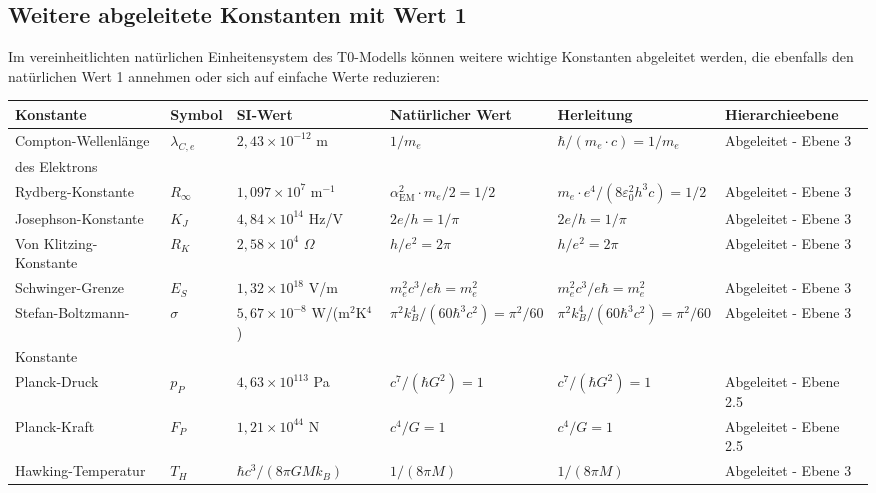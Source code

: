 \documentclass[12pt,a4paper]{article}
\newcommand{\alphaEM}{\alpha_{\text{EM}}}
\begin{document}
	\subsection{Weitere abgeleitete Konstanten mit Wert 1}
	
	Im vereinheitlichten natürlichen Einheitensystem des T0-Modells können weitere wichtige Konstanten abgeleitet werden, die ebenfalls den natürlichen Wert 1 annehmen oder sich auf einfache Werte reduzieren:
	
	\begin{table}[ht]
		\centering
		\begin{adjustbox}{scale=0.65}
			\begin{tabular}{llllll}
				\hline
				\textbf{Konstante} & \textbf{Symbol} & \textbf{SI-Wert} & \textbf{Natürlicher Wert} & \textbf{Herleitung} & \textbf{Hierarchieebene} \\
				\hline
				Compton-Wellenlänge & $\lambda_{C,e}$ & $2,43 \times 10^{-12}$ m & $1/m_e$ & $\hbar/(m_e\cdot c) = 1/m_e$ & Abgeleitet - Ebene 3 \\
				des Elektrons & & & & & \\
				Rydberg-Konstante & $R_\infty$ & $1,097 \times 10^7$ m$^{-1}$ & $\alphaEM^2\cdot m_e/2 = 1/2$ & $m_e\cdot e^4/(8\varepsilon_0^2h^3c) = 1/2$ & Abgeleitet - Ebene 3 \\
				Josephson-Konstante & $K_J$ & $4,84 \times 10^{14}$ Hz/V & $2e/h = 1/\pi$ & $2e/h = 1/\pi$ & Abgeleitet - Ebene 3 \\
				Von Klitzing-Konstante & $R_K$ & $2,58 \times 10^4$ $\Omega$ & $h/e^2 = 2\pi$ & $h/e^2 = 2\pi$ & Abgeleitet - Ebene 3 \\
				Schwinger-Grenze & $E_S$ & $1,32 \times 10^{18}$ V/m & $m_e^2c^3/e\hbar = m_e^2$ & $m_e^2c^3/e\hbar = m_e^2$ & Abgeleitet - Ebene 3 \\
				Stefan-Boltzmann- & $\sigma$ & $5,67 \times 10^{-8}$ W/(m$^2$K$^4$) & $\pi^2k_B^4/(60\hbar^3c^2) = \pi^2/60$ & $\pi^2k_B^4/(60\hbar^3c^2) = \pi^2/60$ & Abgeleitet - Ebene 3 \\
				Konstante & & & & & \\
				Planck-Druck & $p_P$ & $4,63 \times 10^{113}$ Pa & $c^7/(\hbar G^2) = 1$ & $c^7/(\hbar G^2) = 1$ & Abgeleitet - Ebene 2.5 \\
				Planck-Kraft & $F_P$ & $1,21 \times 10^{44}$ N & $c^4/G = 1$ & $c^4/G = 1$ & Abgeleitet - Ebene 2.5 \\
				Hawking-Temperatur & $T_H$ & $\hbar c^3/(8\pi GMk_B)$ & $1/(8\pi M)$ & $1/(8\pi M)$ & Abgeleitet - Ebene 3 \\

\end{tabular}
\end{adjustbox}
\end{table}
\end{document}
